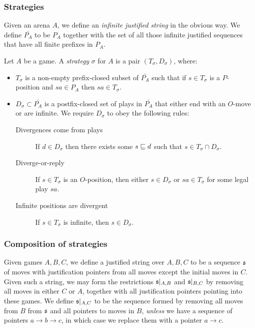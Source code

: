 \documentclass[sigplan,10pt,review]{acmart}\settopmatter{printfolios=true,printccs=false,printacmref=false}
\begin{document}
\subsubsection{Strategies}

Given an arena $A$, we define an \emph{infinite justified string} in the obvious way.  
We define $\bar{P_A}$ to be $P_A$ together with the set of all those infinite justified sequences that have all finite prefixes in $P_A$.

Let $A$ be a game.  
A \emph{strategy} $\sigma$ for $A$ is a pair $(T_\sigma,D_\sigma)$, where:
\begin{itemize}
  \item $T_\sigma$ is a non-empty prefix-closed subset of $\bar{P_A}$ such that if $s\in T_\sigma$ is a $P$-position and $sa\in P_A$ then $sa\in T_\sigma$.
  \item $D_\sigma\subset \bar{P_A}$ is a postfix-closed set of plays in $\bar{P_A}$ that either end with an $O$-move or are infinite.  
    We require $D_\sigma$ to obey the following rules:
    \begin{description}
      \item[Divergences come from plays] If $d\in D_\sigma$ then there exists some $s\sqsubseteq d$ such that $s\in T_\sigma\cap D_\sigma$.
      \item[Diverge-or-reply] If $s\in T_\sigma$ is an $O$-position, then either $s\in D_\sigma$ or $sa\in T_\sigma$ for some legal play $sa$.
      \item[Infinite positions are divergent] If $s\in T_\sigma$ is infinite, then $s\in D_\sigma$.
    \end{description}
\end{itemize}

\subsubsection{Composition of strategies}

Given games $A,B,C$, we define a justified string over $A,B,C$ to be a sequence $\mathfrak s$ of moves with justification pointers from all moves except the initial moves in $C$.  
Given such a string, we may form the restrictions $\mathfrak s\vert_{A,B}$ and $\mathfrak s\vert_{B,C}$ by removing all moves in either $C$ or $A$, together with all justification pointers pointing into these games.  
We define $\mathfrak s\vert_{A,C}$ to be the sequence formed by removing all moves from $B$ from $\mathfrak s$ and all pointers to moves in $B$, \emph{unless} we have a sequence of pointers $a \to b \to c$, in which case we replace them with a pointer $a \to c$.
\end{document}
